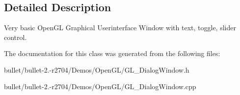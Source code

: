 \subsection{Detailed Description}
Very basic Open\+G\+L Graphical Userinterface Window with text, toggle, slider control. 

The documentation for this class was generated from the following files\+:\begin{DoxyCompactItemize}
\item 
bullet/bullet-\/2.-\/r2704/\+Demos/\+Open\+G\+L/G\+L\+\_\+\+Dialog\+Window.\+h\item 
bullet/bullet-\/2.-\/r2704/\+Demos/\+Open\+G\+L/G\+L\+\_\+\+Dialog\+Window.\+cpp\end{DoxyCompactItemize}
